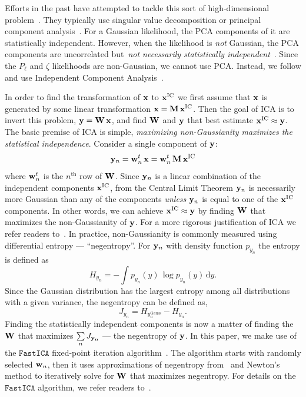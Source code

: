 \documentclass[12pt, letterpaper, preprint]{aastex}
\newcommand{\beq}{\begin{equation}}
\newcommand{\eeq}{\end{equation}}
\newcommand{\pca}{{\small{PCA}}\xspace}
\newcommand{\ica}{{\small{ICA}}\xspace}
\begin{document}
Efforts in the past have attempted to tackle this sort of 
high-dimensional problem~\citep[\emph{e.g.}][]{scoccimarro2000,eisenstein2001,gaztanaga2005,norberg2009,sinha2017}.
They typically use singular value decomposition or principal 
component analysis~\citep[PCA;][]{Press:1992:NRC:148286}. For a Gaussian
likelihood, the PCA components of it are statistically independent. 
However, when the likelihood is \emph{not} Gaussian, the PCA components 
are uncorrelated but~\emph{not necessarily statistically independent}~\citep{hartlap2009}. 
Since the $P_\ell$ and $\zeta$ likelihoods are non-Gaussian, we cannot 
use \pca. Instead, we follow \cite{hartlap2009} and use Independent 
Component Analysis~\citep[\ica][]{herault1984,comon1994,hyvarinen2000,
hyvarinen2001independent}. 

In order to find the transformation of ${\bf x}$ to ${\bf x}^\mathrm{IC}$ 
we first assume that ${\bf x}$ is generated by some linear transformation
${\bf x} = {\bf M}\,{\bf x}^\mathrm{IC}$. Then the goal of \ica is to invert 
this problem, ${\bf y} = {\bf W}\,{\bf x}$, and find ${\bf W}$ and ${\bf y}$ 
that best estimate ${\bf x}^\mathrm{IC} \approx {\bf y}$. The basic 
premise of ICA is simple, \emph{maximizing non-Gaussianity maximizes the 
statistical independence}. Consider a single component of ${\bf y}$: 
\beq
{\bf y}_n = {\bf w}_n^{\tiny t}\,{\bf x} = {\bf w}_n^{\tiny t}\,{\bf M}\,{\bf x}^\mathrm{IC} 
\eeq
where ${\bf w}_n^{\tiny t}$ is the $n^\mathrm{th}$ row of ${\bf W}$. 
Since ${\bf y}_n$ is a linear combination of the independent 
components ${\bf x}^\mathrm{IC}$, from the Central Limit Theorem 
${\bf y}_n$ is necessarily more Gaussian than any of the 
components \emph{unless} ${\bf y}_n$ is equal to one of the 
${\bf x}^\mathrm{IC}$ components. In other words, we can achieve 
${\bf x}^\mathrm{IC} \approx {\bf y}$ by finding ${\bf W}$ that 
maximizes the non-Gaussianity of ${\bf y}$. For a more rigorous 
justification of ICA we refer readers to~\cite{hyvarinen2001independent}. 
In practice, non-Gaussianity is commonly measured using differential
entropy --- ``negentropy''. For ${\bf y}_n$ with density function 
$p_{y_n}$ the entropy is defined as
\beq
H_{y_n} =  - \int p_{y_n} (y)\, \log p_{y_n}(y)\, \mathrm{d}y. 
\eeq
Since the Gaussian distribution has the largest entropy among all 
distributions with a given variance, the negentropy can be defined 
as, 
\beq
J_{y_n} = H_{y_n^\mathrm{Gauss}} - H_{y_n}. 
\eeq
Finding the statistically independent components is now a matter
of finding the ${\bf W}$ that maximizes $\sum\limits_{n} J_{\bf y_n}$
--- the negentropy of ${\bf y}$. In this paper, we make use of the 
$\mathtt{FastICA}$ fixed-point iteration algorithm~\citep{hyvarinen1999}. 
The algorithm starts with randomly selected ${\bf w}_n$, then it uses 
approximations of negentropy from~\cite{hyvarinen1998} and Newton's method 
to iteratively solve for ${\bf W}$ that maximizes negentropy. For details 
on the $\mathtt{FastICA}$ algorithm, we refer readers to~\cite{hyvarinen1999}.
\end{document}
